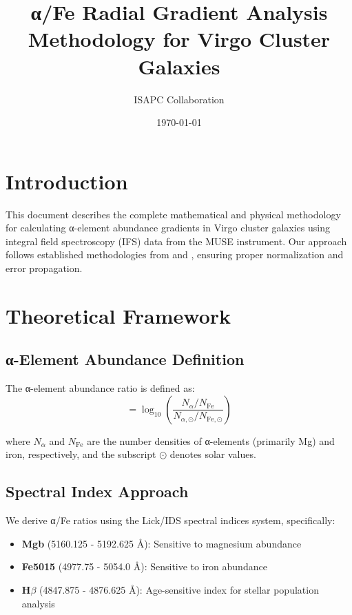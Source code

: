 \documentclass[11pt,a4paper]{article}
\title{α/Fe Radial Gradient Analysis Methodology for Virgo Cluster Galaxies}
\author{ISAPC Collaboration}
\date{\today}
\begin{document}
\maketitle

\section{Introduction}

This document describes the complete mathematical and physical methodology for calculating α-element abundance gradients in Virgo cluster galaxies using integral field spectroscopy (IFS) data from the MUSE instrument. Our approach follows established methodologies from \citet{Liu2016} and \citet{Li2019}, ensuring proper normalization and error propagation.

\section{Theoretical Framework}

\subsection{α-Element Abundance Definition}

The α-element abundance ratio is defined as:
\begin{equation}
[\alpha/\text{Fe}] = \log_{10}\left(\frac{N_\alpha/N_\text{Fe}}{N_{\alpha,\odot}/N_{\text{Fe},\odot}}\right)
\end{equation}

where $N_\alpha$ and $N_\text{Fe}$ are the number densities of α-elements (primarily Mg) and iron, respectively, and the subscript $\odot$ denotes solar values.

\subsection{Spectral Index Approach}

We derive α/Fe ratios using the Lick/IDS spectral indices system, specifically:
\begin{itemize}
\item \textbf{Mgb} (5160.125 - 5192.625 Å): Sensitive to magnesium abundance
\item \textbf{Fe5015} (4977.75 - 5054.0 Å): Sensitive to iron abundance  
\item \textbf{H$\beta$} (4847.875 - 4876.625 Å): Age-sensitive index for stellar population analysis
\end{itemize}
\end{document}
